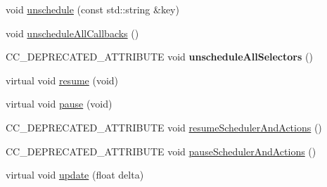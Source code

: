 \begin{Indent}
\begin{DoxyCompactItemize}
\item 
void \hyperlink{classNode_ad7864aa1e9a8391007eca370628d3ce7}{unschedule} (const std\+::string \&key)
\item 
void \hyperlink{classNode_ab8711d9b97d8b944a95c4227c7e9869f}{unschedule\+All\+Callbacks} ()
\item 
\mbox{\label{classNode_a11bc90abb2fd9e8211abcdb2de9d1f76}} 
C\+C\+\_\+\+D\+E\+P\+R\+E\+C\+A\+T\+E\+D\+\_\+\+A\+T\+T\+R\+I\+B\+U\+TE void {\bfseries unschedule\+All\+Selectors} ()
\item 
virtual void \hyperlink{classNode_ab7915bc94d66dd198bc93c5034d454b0}{resume} (void)
\item 
virtual void \hyperlink{classNode_a2f262913d8d4f3f4ce386752b522208f}{pause} (void)
\item 
C\+C\+\_\+\+D\+E\+P\+R\+E\+C\+A\+T\+E\+D\+\_\+\+A\+T\+T\+R\+I\+B\+U\+TE void \hyperlink{classNode_ac23454950364265a3da67fb9e8becdd1}{resume\+Scheduler\+And\+Actions} ()
\item 
C\+C\+\_\+\+D\+E\+P\+R\+E\+C\+A\+T\+E\+D\+\_\+\+A\+T\+T\+R\+I\+B\+U\+TE void \hyperlink{classNode_a7ff40b01310820986b26dd335ec19670}{pause\+Scheduler\+And\+Actions} ()
\item 
virtual void \hyperlink{classNode_ac907777c1012f808043412c76cf9e183}{update} (float delta)
\end{DoxyCompactItemize}
\end{Indent}
